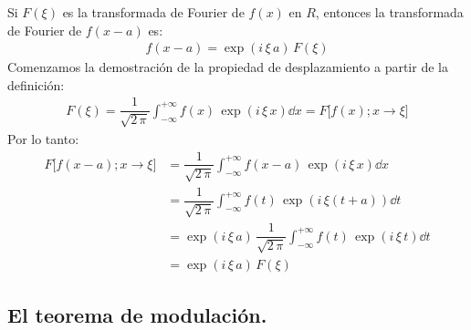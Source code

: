Si $F(\xi)$ es la transformada de Fourier de $f(x)$ en $R$, entonces la transformada de Fourier de $f(x - a)$ es:
\begin{align*}
f(x - a) = \exp(i \, \xi \, a) \, F(\xi)
\end{align*}
Comenzamos la demostración de la propiedad de desplazamiento a partir de la definición:
\begin{align*}
F(\xi) = \dfrac{1}{\sqrt{2 \, \pi}} \int_{-\infty}^{+\infty} f(x) \, \exp(i \, \xi \, x) \dd{x} = F \big[f(x); x \to \xi \big]
\end{align*}
Por lo tanto:
\begin{align*}
F \big[f(x - a); x \to \xi \big] &= \dfrac{1}{\sqrt{2 \, \pi}} \int_{-\infty}^{+\infty} f(x - a) \, \exp(i \, \xi \, x) \dd{x} \\[0.5em]
&= \dfrac{1}{\sqrt{2 \, \pi}} \int_{-\infty}^{+\infty} f(t) \, \exp(i \, \xi (t + a)) \dd{t} \\[0.5em]
&= \exp(i \, \xi \, a) \, \dfrac{1}{\sqrt{2 \, \pi}} \int_{-\infty}^{+\infty} f(t) \, \exp(i \, \xi \, t) \dd{t} \\[0.5em]
&= \exp(i \, \xi \, a) \, F (\xi) 
\end{align*}

\subsection{El teorema de modulación.}

